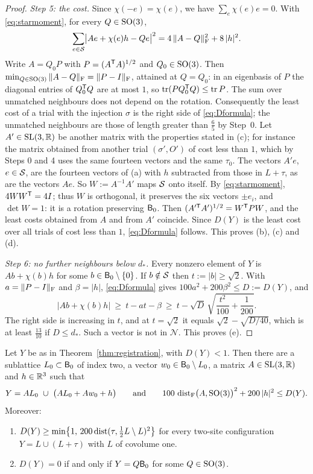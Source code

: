 \begin{proof}
\emph{Step 5: the cost.} Since $\chi(-e)=\chi(e)$, we have $\sum_e\chi(e)e=0$. With \eqref{eq:starmoment}, for every $Q\in\mathrm{SO}(3)$,
\[
  \sum_{e\in\mathcal S}\bigl|Ae+\chi(e)h-Qe\bigr|^2=4\,\|A-Q\|_\mathrm F^2+8\,|h|^2 .
\]
Write $A=Q_0P$ with $P=(A^\mathsf T A)^{1/2}$ and $Q_0\in\mathrm{SO}(3)$. Then $\min_{Q\in\mathrm{SO}(3)}\|A-Q\|_\mathrm F=\|P-I\|_\mathrm F$, attained at $Q=Q_0$:
in an eigenbasis of $P$ the diagonal entries of $Q_0^\mathsf T Q$ are at most $1$, so $\operatorname{tr}(PQ_0^\mathsf T Q)\le\operatorname{tr} P$. The sum over unmatched
neighbours does not depend on the rotation. Consequently the least cost of a trial with the injection $\sigma$ is the right side of
\eqref{eq:Dformula}; the unmatched neighbours are those of length greater than $\frac65$ by Step~0.
Let $A'\in\mathrm{SL}(3,\mathbb R)$ be another matrix with the properties stated in (c); for instance the matrix obtained from another trial
$(\sigma',O')$ of cost less than $1$, which by Steps 0 and 4 uses the same fourteen vectors and the same $\tau_0$. The vectors $A'e$,
$e\in\mathcal S$, are the fourteen vectors of (a) with $h$ subtracted from those in $L+\tau$, as are the vectors $Ae$. So
$W:=A^{-1}A'$ maps $\mathcal S$ onto itself. By \eqref{eq:starmoment}, $4WW^\mathsf T=4I$; thus $W$ is orthogonal, it preserves the six vectors
$\pm e_i$, and $\det W=1$: it is a rotation preserving $\mathsf B_0$. Then $(A'^\T A')^{1/2}=W^\T PW$, and the least costs obtained from $A$
and from $A'$ coincide. Since $D(Y)$ is the least cost over all trials of cost less than $1$, \eqref{eq:Dformula} follows. This
proves (b), (c) and (d).

\emph{Step 6: no further neighbours below $d_*$.} Every nonzero element of $Y$ is $Ab+\chi(b)h$ for some $b\in\mathsf B_0\setminus\{0\}$. If
$b\notin\mathcal S$ then $t:=|b|\ge\sqrt2$. With $a=\|P-I\|_\mathrm F$ and $\beta=|h|$, \eqref{eq:Dformula} gives $100a^2+200\beta^2\le D:=D(Y)$,
and
\[
  |Ab+\chi(b)h|\ \ge\ t-at-\beta\ \ge\ t-\sqrt D\,\sqrt{\frac{t^2}{100}+\frac1{200}} .
\]
The right side is increasing in $t$, and at $t=\sqrt2$ it equals $\sqrt2-\sqrt{D/40}$, which is at least $\frac{13}{10}$ if
$D\le d_*$. Such a vector is not in $\mathcal N$. This proves (e).
\end{proof}

\begin{corollary}\label{cor:registered}
Let $Y$ be as in Theorem~\ref{thm:registration}, with $D(Y)<1$. Then there are a sublattice $L_0\subset\mathsf B_0$ of index two, a vector
$w_0\in\mathsf B_0\setminus L_0$, a matrix $A\in\mathrm{SL}(3,\mathbb R)$ and $h\in\mathbb R^3$ such that
\begin{equation}\label{eq:registered}
  Y=AL_0\ \cup\ \bigl(AL_0+Aw_0+h\bigr)\qquad\text{and}\qquad 100\,\operatorname{dist}_\mathrm F\bigl(A,\mathrm{SO}(3)\bigr)^2+200\,|h|^2\le D(Y).
\end{equation}
Moreover:
\begin{enumerate}
\item[\textup{(i)}] $D(Y)\ge\min\bigl\{1,\,200\operatorname{dist}(\tau,\tfrac12L\setminus L)^2\bigr\}$ for every two-site configuration
$Y=L\cup(L+\tau)$ with $L$ of covolume one.
\item[\textup{(ii)}] $D(Y)=0$ if and only if $Y=Q\mathsf B_0$ for some $Q\in\mathrm{SO}(3)$.
\end{enumerate}
\end{corollary}


